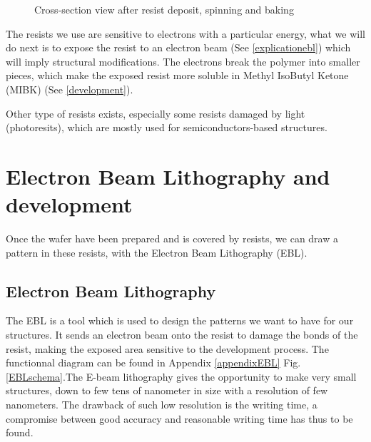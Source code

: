             \begin{figure}
                \centering 
                \caption{Cross-section view after resist deposit, spinning and baking}
                \label{resine}
            \end{figure}
            
                        
            The resists we use are sensitive to electrons with a particular energy, what we will do next is to expose the resist to an electron beam (See \ref{explicationebl}) which will imply structural modifications. The electrons break the polymer into smaller pieces, which make the exposed resist more soluble in Methyl IsoButyl Ketone (MIBK) (See \ref{development}).
            
              Other type of resists exists, especially some resists damaged by light (photoresits), which are mostly used for semiconductors-based structures.
              
    \section{Electron Beam Lithography and development}
        
        Once the wafer have been prepared and is covered by resists, we can draw a pattern in these resists, with the Electron Beam Lithography (EBL).
        
        \subsection{Electron Beam Lithography}
            The EBL is a tool which is used to design the patterns we want to have for our structures\cite{EBL_theory}. It sends an electron beam onto the resist to damage the bonds of the resist, making the exposed area sensitive to the development process. The functionnal diagram can be found in Appendix \ref{appendixEBL} Fig. \ref{EBLschema}.The E-beam lithography gives the opportunity to make very small structures, down to few tens of nanometer in size with a resolution of few nanometers. The drawback of such low resolution is the writing time, a compromise between good accuracy and reasonable writing time has thus to be found.
            
